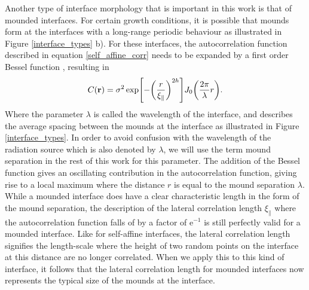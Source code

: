 Another type of interface morphology that is important in this work is that of mounded interfaces. For certain growth conditions, it is possible that mounds form at the interfaces with a long-range periodic behaviour as illustrated in Figure \ref{interface_types} b). For these interfaces, the autocorrelation function described in equation \ref{self_affine_corr} needs to be expanded by a first order Bessel function \cite{zhao2000characterization}, resulting in
\begin{equation}\label{mounded_corr}
	C(\vb{r}) = \sigma^2 \exp[-\qty(\frac{r}{\xi_{\parallel}})^{2h}]J_0\qty(\frac{2\pi}{\lambda}r).
\end{equation}
Where the parameter $\lambda$ is called the wavelength of the interface, and describes the average spacing between the mounds at the interface as illustrated in Figure \ref{interface_types}. In order to avoid confusion with the wavelength of the radiation source which is also denoted by $\lambda$, we will use the term mound separation in the rest of this work for this parameter. The addition of the Bessel function gives an oscillating contribution in the autocorrelation function, giving rise to a local maximum where the distance $r$ is equal to the mound separation $\lambda$. While a mounded interface does have a clear characteristic length in the form of the mound separation, the description of the lateral correlation length $\xi_{\parallel}$ where the autocorrelation function falls of by a factor of e$^{-1}$ is still perfectly valid for a mounded interface. Like for self-affine interfaces, the lateral correlation length signifies the length-scale where the height of two random points on the interface at this distance are no longer correlated. When we apply this to this kind of interface, it follows that the lateral correlation length for mounded interfaces now represents the typical size of the mounds at the interface.

